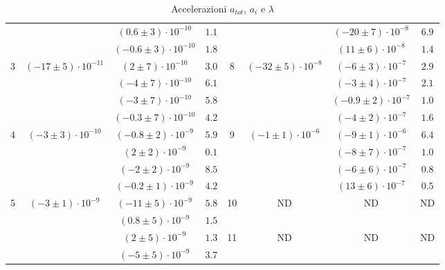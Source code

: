\documentclass[a4paper,11pt,oneside]{article}
\begin{document}
\begin{table}[h!]
{\begin{tabular}{|c|c|c|c||c|c|c|c|}
        & & {\cellcolor[rgb]{0.85,0.85,0.85}}$(0.6 \pm 3)\cdot10^{-10}$ & {\cellcolor[rgb]{0.85,0.85,0.85}}$1.1$ & & & {\cellcolor[rgb]{0.85,0.85,0.85}}$(-20 \pm 7)\cdot10^{-8}$ & {\cellcolor[rgb]{0.85,0.85,0.85}}{\cellcolor[rgb]{0.85,0.85,0.85}}$6.9$ \\
        & & $(-0.6 \pm 3)\cdot10^{-10}$ & $1.8$ & & & $(11 \pm 6)\cdot10^{-8}$ & $1.4$ \\
        \hline
        \multirow{4}{*}{3}& \multirow{4}{*}{$(-17 \pm 5)\cdot10^{-11}$}& {\cellcolor[rgb]{0.85,0.85,0.85}}$(2 \pm 7)\cdot10^{-10}$ & {\cellcolor[rgb]{0.85,0.85,0.85}}$3.0$ & \multirow{4}{*}{8}& \multirow{4}{*}{$(-32 \pm 5)\cdot10^{-8}$}& {\cellcolor[rgb]{0.85,0.85,0.85}}$(-6 \pm 3)\cdot10^{-7}$ & {\cellcolor[rgb]{0.85,0.85,0.85}}$2.9$ \\
        & & $(-4 \pm 7)\cdot10^{-10}$ & $6.1$ & & & $(-3 \pm 4)\cdot10^{-7}$ & $2.1$ \\
        & & {\cellcolor[rgb]{0.85,0.85,0.85}}$(-3 \pm 7)\cdot10^{-10}$ & {\cellcolor[rgb]{0.85,0.85,0.85}}$5.8$ & & & {\cellcolor[rgb]{0.85,0.85,0.85}}$(-0.9 \pm 2)\cdot10^{-7}$ & {\cellcolor[rgb]{0.85,0.85,0.85}}$1.0$ \\
        & & $(-0.3 \pm 7)\cdot10^{-10}$ & $4.2$ & & & $(-4 \pm 2)\cdot10^{-7}$ & $1.6$ \\
        \hline
        \multirow{4}{*}{4}& \multirow{4}{*}{$(-3 \pm 3)\cdot10^{-10}$}& {\cellcolor[rgb]{0.85,0.85,0.85}}$(-0.8 \pm 2)\cdot10^{-9}$ & {\cellcolor[rgb]{0.85,0.85,0.85}}$5.9$ & \multirow{4}{*}{9}& \multirow{4}{*}{$(-1 \pm 1)\cdot10^{-6}$}& {\cellcolor[rgb]{0.85,0.85,0.85}}$(-9 \pm 1)\cdot10^{-6}$ & {\cellcolor[rgb]{0.85,0.85,0.85}}$6.4$ \\
        & & $(2 \pm 2)\cdot10^{-9}$ & $0.1$ & & & $(-8 \pm 7)\cdot10^{-7}$ & $1.0$ \\
        & & {\cellcolor[rgb]{0.85,0.85,0.85}}$(-2 \pm 2)\cdot10^{-9}$ & {\cellcolor[rgb]{0.85,0.85,0.85}}$8.5$ & & & {\cellcolor[rgb]{0.85,0.85,0.85}}$(-6 \pm 6)\cdot10^{-7}$ & {\cellcolor[rgb]{0.85,0.85,0.85}}$0.8$ \\
        & & $(-0.2 \pm 1)\cdot10^{-9}$ & $4.2$ & & & $(13 \pm 6)\cdot10^{-7}$ & $0.5$ \\
        \hline
        \multirow{4}{*}{5}& \multirow{4}{*}{$(-3 \pm 1)\cdot10^{-9}$}& {\cellcolor[rgb]{0.85,0.85,0.85}}$(-11 \pm 5)\cdot10^{-9}$ & {\cellcolor[rgb]{0.85,0.85,0.85}}$5.8$ & \multirow{2}{*}{10}& \multirow{2}{*}{ND}& \multirow{2}{*}{ND}& \multirow{2}{*}{ND}\\
        & & $(0.8 \pm 5)\cdot10^{-9}$ & $1.5$ & & & & \\ \cline{5-8}
        & & {\cellcolor[rgb]{0.85,0.85,0.85}}$(2 \pm 5)\cdot10^{-9}$ & {\cellcolor[rgb]{0.85,0.85,0.85}}$1.3$ & \multirow{2}{*}{11} & \multirow{2}{*}{ND}& \multirow{2}{*}{ND}& \multirow{2}{*}{ND}\\
        & & $(-5 \pm 5)\cdot10^{-9}$ & $3.7$ & & & & \\
        \hline
    \end{tabular}}
    \caption{Accelerazioni $a_{tot}$, $a_{i}$ e $\lambda$}
    \label{tab:comp_acc}
\end{table}
\end{document}
